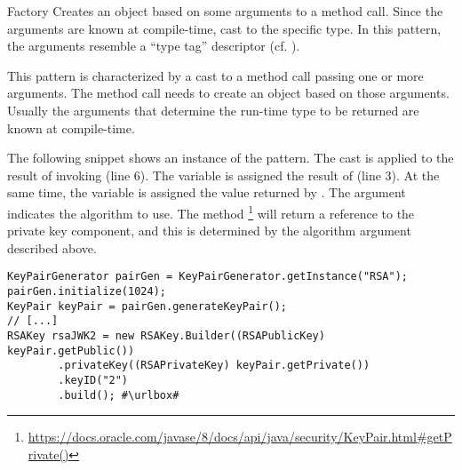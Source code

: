 \begin{pattern}{Factory}
Creates an object based on some arguments to a method call.
Since the arguments are known at compile-time, cast to the specific type.
In this pattern, the arguments resemble a ``type tag'' descriptor (cf.
).

This pattern is characterized by a cast to a method call passing one or more arguments.
The method call needs to create an object based on those arguments.
Usually the arguments that determine the run-time type to be returned are known at compile-time.

\instances{}
The following snippet
shows an instance of the \thisp{} pattern.
The cast is applied to the result of invoking 
(line 6).
The variable  is assigned the result of  (line 3).
At the same time, the  variable is assigned the value returned by .
The argument  indicates the algorithm to use.
The method%
\footnote{\url{https://docs.oracle.com/javase/8/docs/api/java/security/KeyPair.html\#getPrivate()}}
will return a reference to the private key component,
and this is determined by the algorithm argument described above.

\def\urlvar{http://bit.ly/connect2id_oauth_2_0_sdk_with_2HvRlUX}
\begin{verbatim}
KeyPairGenerator pairGen = KeyPairGenerator.getInstance("RSA");
pairGen.initialize(1024);
KeyPair keyPair = pairGen.generateKeyPair();
// [...]
RSAKey rsaJWK2 = new RSAKey.Builder((RSAPublicKey) keyPair.getPublic())
        .privateKey((RSAPrivateKey) keyPair.getPrivate())
        .keyID("2")
        .build(); #\urlbox#
\end{verbatim}


\end{pattern}
